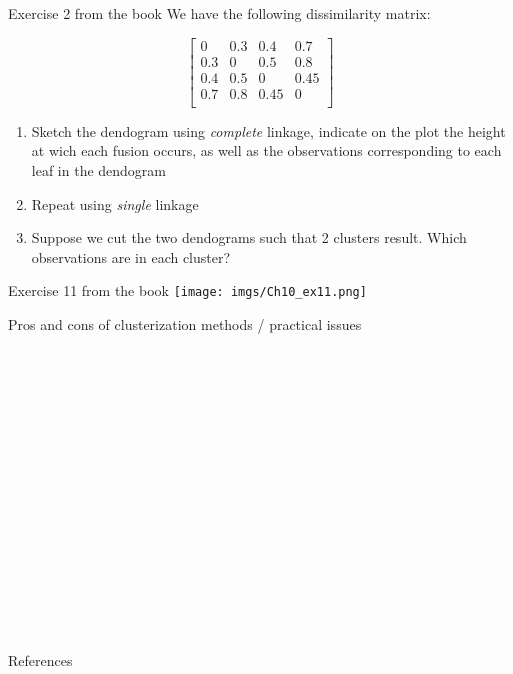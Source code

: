 \documentclass[
  10pt,
  ignorenonframetext,
]{beamer}
\begin{document}
\begin{frame}{Exercise 2 from the book}
\protect\hypertarget{exercise-2-from-the-book}{}
We have the following dissimilarity matrix:

\[\begin{bmatrix}0&0.3&0.4&0.7 \\0.3&0&0.5&0.8 \\0.4&0.5&0&0.45 \\0.7&0.8&0.45&0 \\\end{bmatrix}\]

\begin{enumerate}
\item
  Sketch the dendogram using \emph{complete} linkage, indicate on the
  plot the height at wich each fusion occurs, as well as the
  observations corresponding to each leaf in the dendogram
\item
  Repeat using \emph{single} linkage
\item
  Suppose we cut the two dendograms such that 2 clusters result. Which
  observations are in each cluster?
\end{enumerate}
\end{frame}

\begin{frame}{Exercise 11 from the book}
\protect\hypertarget{exercise-11-from-the-book}{}
\texttt{[image: imgs/Ch10\_ex11.png]}
\end{frame}

\begin{frame}
\begin{block}{Pros and cons of clusterization methods / practical
issues}
\protect\hypertarget{pros-and-cons-of-clusterization-methods-practical-issues}{}
\(~\)

\(~\)

\(~\)

\(~\)

\(~\)

\(~\)

\(~\)

\(~\)

\(~\)

\(~\)
\end{block}
\end{frame}

\begin{frame}{References}
\protect\hypertarget{references}{}
\end{frame}
\end{document}
